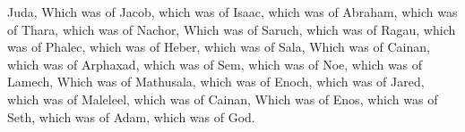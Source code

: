 {Juda,
Which
was
{} of
Jacob, which
was
{} of
Isaac, which
was
{} of
Abraham, which
was
{} of
Thara, which
was
{} of
Nachor,
Which
was
{} of
Saruch, which
was
{} of
Ragau, which
was
{} of
Phalec, which
was
{} of
Heber, which
was
{} of
Sala,
Which
was
{} of
Cainan, which
was
{} of
Arphaxad, which
was
{} of
Sem, which
was
{} of
Noe, which
was
{} of
Lamech,
Which
was
{} of
Mathusala, which
was
{} of
Enoch, which
was
{} of
Jared, which
was
{} of
Maleleel, which
was
{} of
Cainan,
Which
was
{} of
Enos, which
was
{} of
Seth, which
was
{} of
Adam, which
was
{} of
God.

}
